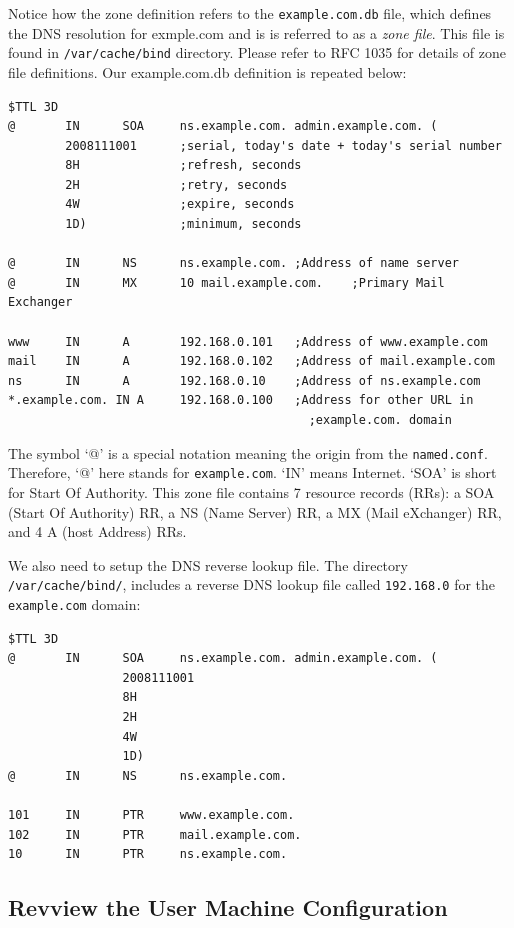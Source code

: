 Notice how the zone definition refers to the {\tt example.com.db} file,
which defines the DNS resolution for exmple.com and is is referred 
to as a \textit{zone file}.  This file is found in \texttt{/var/cache/bind} directory.
Please refer to RFC 1035 for details of zone file definitions.  Our example.com.db 
definition is repeated below:
\begin{verbatim}
$TTL 3D
@       IN      SOA     ns.example.com. admin.example.com. (
        2008111001      ;serial, today's date + today's serial number
        8H              ;refresh, seconds
        2H              ;retry, seconds
        4W              ;expire, seconds
        1D)             ;minimum, seconds

@       IN      NS      ns.example.com.	;Address of name server
@       IN      MX      10 mail.example.com.	;Primary Mail Exchanger

www     IN      A       192.168.0.101	;Address of www.example.com
mail    IN      A       192.168.0.102	;Address of mail.example.com
ns      IN      A       192.168.0.10	;Address of ns.example.com
*.example.com. IN A     192.168.0.100	;Address for other URL in 
                                          ;example.com. domain
\end{verbatim}

The symbol `@' is a special notation meaning the origin from the {\tt named.conf}. 
Therefore, `@' here stands for {\tt example.com}. `IN' means Internet. 
`SOA' is short for Start Of Authority.
This zone file contains 7 resource records (RRs): a SOA (Start Of Authority) RR, 
a NS (Name Server) RR, a MX (Mail eXchanger) RR, and 4 A (host Address) RRs.

We also need to setup the DNS reverse lookup file.
The directory \texttt{/var/cache/bind/}, includes a reverse DNS lookup file 
called \texttt{192.168.0} for the \texttt{example.com} domain:
\begin{verbatim}
$TTL 3D
@       IN      SOA     ns.example.com. admin.example.com. (
                2008111001
                8H
                2H
                4W
                1D)
@       IN      NS      ns.example.com.

101     IN      PTR     www.example.com.
102     IN      PTR     mail.example.com.
10      IN      PTR     ns.example.com.
\end{verbatim}


\subsection{Revview the User Machine Configuration} 
\label{subsec:user_machine}

